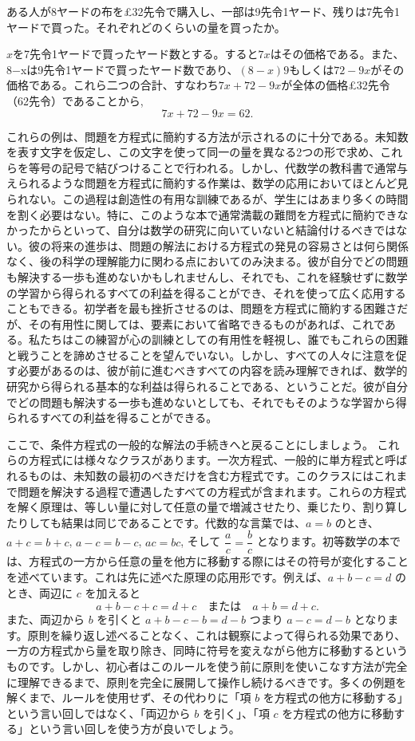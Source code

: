 \documentclass[a4paper,11pt,openany]{ltjsbook}
\begin{document}
ある人が8ヤードの布を£32先令で購入し、一部は9先令1ヤード、残りは7先令1ヤードで買った。それぞれどのくらいの量を買ったか。

$x$を7先令1ヤードで買ったヤード数とする。すると$7x$はその価格である。また、8−xは9先令1ヤードで買ったヤード数であり、$(8 - x)9$もしくは$72 - 9x$がその価格である。これら二つの合計、すなわち$7x + 72 - 9x$が全体の価格£32先令（62先令）であることから,
\[
7x + 72 - 9x = 62.
\]

これらの例は、問題を方程式に簡約する方法が示されるのに十分である。未知数を表す文字を仮定し、この文字を使って同一の量を異なる2つの形で求め、これらを等号の記号で結びつけることで行われる。しかし、代数学の教科書で通常与えられるような問題を方程式に簡約する作業は、数学の応用においてほとんど見られない。この過程は創造性の有用な訓練であるが、学生にはあまり多くの時間を割く必要はない。特に、このような本で通常満載の難問を方程式に簡約できなかったからといって、自分は数学の研究に向いていないと結論付けるべきではない。彼の将来の進歩は、問題の解法における方程式の発見の容易さとは何ら関係なく、後の科学の理解能力に関わる点においてのみ決まる。彼が自分でどの問題も解決する一歩も進めないかもしれませんし、それでも、これを経験せずに数学の学習から得られるすべての利益を得ることができ、それを使って広く応用することもできる。初学者を最も挫折させるのは、問題を方程式に簡約する困難さだが、その有用性に関しては、要素において省略できるものがあれば、これである。私たちはこの練習が心の訓練としての有用性を軽視し、誰でもこれらの困難と戦うことを諦めさせることを望んでいない。しかし、すべての人々に注意を促す必要があるのは、彼が前に進むべきすべての内容を読み理解できれば、数学的研究から得られる基本的な利益は得られることである、ということだ。彼が自分でどの問題も解決する一歩も進めないとしても、それでもそのような学習から得られるすべての利益を得ることができる。

ここで、条件方程式の一般的な解法の手続きへと戻ることにしましょう。
これらの方程式には様々なクラスがあります。一次方程式、一般的に単方程式と呼ばれるものは、未知数の最初のべきだけを含む方程式です。このクラスにはこれまで問題を解決する過程で遭遇したすべての方程式が含まれます。これらの方程式を解く原理は、等しい量に対して任意の量で増減させたり、乗じたり、割り算したりしても結果は同じであることです。代数的な言葉では、$a = b$ のとき、$a + c = b + c$, $a - c = b - c$, $ac = bc$, そして $\dfrac{a}{c} = \dfrac{b}{c}$ となります。初等数学の本では、方程式の一方から任意の量を他方に移動する際にはその符号が変化することを述べています。これは先に述べた原理の応用形です。例えば、$a + b - c = d$ のとき、両辺に $c$ を加えると
\[
a + b - c + c = d + c \quad\text{または}\quad a + b = d + c.
\]
また、両辺から $b$ を引くと $a + b - c - b = d - b$ つまり $a - c = d - b$ となります。原則を繰り返し述べることなく、これは観察によって得られる効果であり、一方の方程式から量を取り除き、同時に符号を変えながら他方に移動するというものです。しかし、初心者はこのルールを使う前に原則を使いこなす方法が完全に理解できるまで、原則を完全に展開して操作し続けるべきです。多くの例題を解くまで、ルールを使用せず、その代わりに「項 $b$ を方程式の他方に移動する」という言い回しではなく、「両辺から $b$ を引く」、「項 $c$ を方程式の他方に移動する」という言い回しを使う方が良いでしょう。
\end{document}
